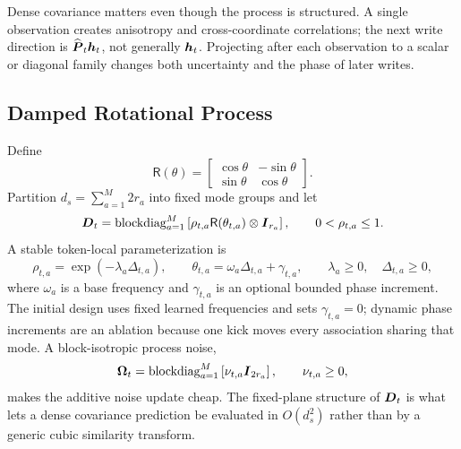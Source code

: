 \documentclass[11pt,letterpaper,logo]{yalearxiv}
\newcommand{\blockdiag}{\operatorname{blockdiag}}
\newcommand{\Rot}{\mathsf{R}}
\begin{document}
Dense covariance matters even though the process is structured. A single observation creates
anisotropy and cross-coordinate correlations; the next write direction is
$\widehat{\boldsymbol{P}}_t\boldsymbol{h}_t$, not generally $\boldsymbol{h}_t$. Projecting after each observation to a
scalar or diagonal family changes both uncertainty and the phase of later writes.

\subsection{Damped Rotational Process}
\label{sec:kdn2-rotation}

Define
\begin{equation}
  \Rot(\theta)
  =
  \begin{bmatrix}
    \cos\theta&-\sin\theta\\
    \sin\theta& \cos\theta
  \end{bmatrix}.
  \label{eq:kdn2-rotation-matrix}
\end{equation}
Partition $d_s=\sum_{a=1}^{M}2r_a$ into fixed mode groups and let
\begin{equation}
  \ve{D}_t
  =
  \blockdiag_{a=1}^{M}
  \left[
    \rho_{t,a}\Rot(\theta_{t,a})\otimes\ve{I}_{r_a}
  \right],
  \qquad
  0<\rho_{t,a}\leq1.
  \label{eq:kdn2-rotational-D}
\end{equation}
A stable token-local parameterization is
\begin{equation}
  \rho_{t,a}
  =
  \exp(-\lambda_a\Delta_{t,a}),
  \qquad
  \theta_{t,a}
  =
  \omega_a\Delta_{t,a}+\gamma_{t,a},
  \qquad
  \lambda_a\geq0,\quad \Delta_{t,a}\geq0,
  \label{eq:kdn2-rho-theta}
\end{equation}
where $\omega_a$ is a base frequency and $\gamma_{t,a}$ is an optional bounded phase increment.
The initial design uses fixed learned frequencies and sets $\gamma_{t,a}=0$; dynamic phase
increments are an ablation because one kick moves every association sharing that mode. A
block-isotropic process noise,
\begin{equation}
  \ve{\Omega}_t
  =
  \blockdiag_{a=1}^{M}
  \left[\nu_{t,a}\ve{I}_{2r_a}\right],
  \qquad
  \nu_{t,a}\geq0,
  \label{eq:kdn2-process-noise}
\end{equation}
makes the additive noise update cheap. The fixed-plane structure of $\boldsymbol{D}_t$ is what lets a
dense covariance prediction be evaluated in $O(d_s^2)$ rather than by a generic cubic similarity
transform.
\end{document}
